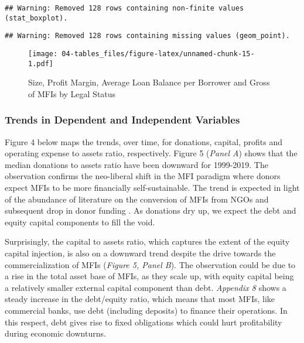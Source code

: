 \documentclass[a4paper,nobind]{templates/ociamthesis}
\begin{document}
\begin{landscape}
\begin{verbatim}
## Warning: Removed 128 rows containing non-finite values (stat_boxplot).
\end{verbatim}

\begin{verbatim}
## Warning: Removed 128 rows containing missing values (geom_point).
\end{verbatim}

\begin{figure}
\centering
\texttt{[image: 04-tables\_files/figure-latex/unnamed-chunk-15-1.pdf]}
\caption{\label{fig:unnamed-chunk-15}Size, Profit Margin, Average Loan Balance per Borrower and Gross of MFIs by Legal Status}
\end{figure}

\end{landscape}
\newpage

\hypertarget{trends-in-dependent-and-independent-variables}{%
\subsubsection{\texorpdfstring{\textbf{Trends in Dependent and Independent Variables}}{Trends in Dependent and Independent Variables}}\label{trends-in-dependent-and-independent-variables}}

Figure 4 below maps the trends, over time, for donations, capital, profits and operating expense to assets ratio, respectively. Figure 5 (\emph{Panel A}) shows that the median donations to assets ratio have been downward for 1999-2019. The observation confirms the neo-liberal shift in the MFI paradigm where donors expect MFIs to be more financially self-sustainable. The trend is expected in light of the abundance of literature on the conversion of MFIs from NGOs and subsequent drop in donor funding \autocite{d2017ngos}. As donations dry up, we expect the debt and equity capital components to fill the void.

Surprisingly, the capital to assets ratio, which captures the extent of the equity capital injection, is also on a downward trend despite the drive towards the commercialization of MFIs (\emph{Figure 5, Panel B}). The observation could be due to a rise in the total asset base of MFIs, as they scale up, with equity capital being a relatively smaller external capital component than debt. \emph{Appendix 8} shows a steady increase in the debt/equity ratio, which means that most MFIs, like commercial banks, use debt (including deposits) to finance their operations. In this respect, debt gives rise to fixed obligations which could hurt profitability during economic downturns.
\end{document}
